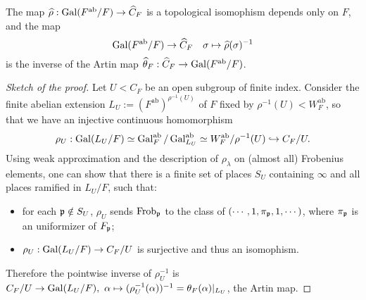 \documentclass{article}
\DeclareMathOperator{\frob}{Frob}
\newcommand{\ab}{\mathrm{ab}}
\begin{document}
\begin{theorem}\label{inverse of Artin map}
    The map $\hat\rho : \gal(F^\ab/F)\to \hat{C}_F$ is a topological isomophism depends only on $F$,
    and the map \[\gal(F^\ab/F)\to \hat{C}_F\quad \sigma\mapsto \hat\rho(\sigma)^{-1}\]
    is the inverse of the Artin map $\hat\theta_F : \hat C_F\to \gal(F^\ab/F)$.
\end{theorem}
\begin{proof}[Sketch of the proof]

Let $U < C_F$ be an open subgroup of finite index.
Consider the finite abelian extension $L_U := (F^\ab)^{\rho^{-1}(U)}$ of $F$ fixed by $\rho^{-1}(U) < W_F^\ab$,
so that
we have an injective continuous homomorphism
\[\rho_U : \gal(L_U/F) \simeq\gal_F^\ab/\gal_{L_U}^\ab \simeq W_F^\ab/\rho^{-1}(U)\hookrightarrow C_F/U.\]
Using weak approximation and the description of $\rho_\lambda$ on (almost all) Frobenius elements,
one can show that there is a finite set of places $S_U$ containing $\infty$ and all places ramified in $L_U/F$, such that:
\begin{itemize}
    \item for each $\mathfrak{p}\notin S_U$, $\rho_U$ sends $\frob_\p$ to the class of $(\cdots, 1, \pi_{\mathfrak{p}}, 1, \cdots)$, where $\pi_{\mathfrak{p}}$ is an uniformizer of $F_{\mathfrak{p}}$;
    \item $\rho_U : \operatorname{Gal}(L_U/F)\to C_F/U$ is surjective and thus an isomophism.
\end{itemize}
Therefore the pointwise inverse of $\rho_U^{-1}$ is
$C_F/U\to \operatorname{Gal}(L_U/F),\ \alpha\mapsto (\rho_U^{-1}(\alpha))^{-1} = \theta_F(\alpha)|_{L_U}$, the Artin map.


\end{proof}
\end{document}

